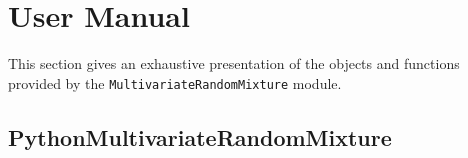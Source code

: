 
\section{User Manual}

This section gives an exhaustive presentation of the objects and functions provided by the \texttt{Multivariate\-Random\-Mixture} module.

\subsection{PythonMultivariateRandomMixture}


